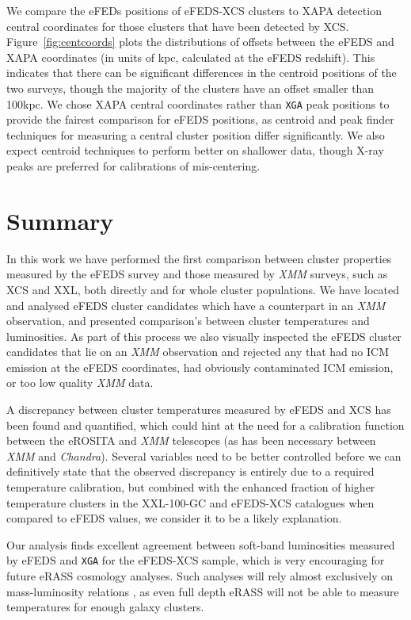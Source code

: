 \documentclass[fleqn,usenatbib]{mnras}
\begin{document}
We compare the eFEDs positions of eFEDS-XCS clusters to XAPA detection central coordinates for those clusters that have been detected by XCS.  Figure~\ref{fig:centcoords} plots the distributions of offsets between the eFEDS and XAPA coordinates (in units of kpc, calculated at the eFEDS redshift).  This indicates that there can be significant differences in the centroid positions of the two surveys, though the majority of the clusters have an offset smaller than 100kpc. We chose XAPA central coordinates rather than \texttt{XGA} peak positions to provide the fairest comparison for eFEDS positions, as centroid and peak finder techniques for measuring a central cluster position differ significantly.  We also expect centroid techniques to perform better on shallower data, though X-ray peaks are preferred for calibrations of mis-centering. 


\section{Summary}
\label{sec:summary}

In this work we have performed the first comparison between cluster properties measured by the eFEDS survey and those measured by {\em XMM} surveys, such as XCS and XXL, both directly and for whole cluster populations. We have located and analysed eFEDS cluster candidates which have a counterpart in an {\em XMM} observation, and presented comparison's between cluster temperatures and luminosities. As part of this process we also visually inspected the eFEDS cluster candidates that lie on an {\em XMM} observation and rejected any that had no ICM emission at the eFEDS coordinates, had obviously contaminated ICM emission, or too low quality {\em XMM} data.

A discrepancy between cluster temperatures measured by eFEDS and XCS has been found and quantified, which could hint at the need for a calibration function between the eROSITA and {\em XMM} telescopes (as has been necessary between {\em XMM} and {\em Chandra}). Several variables need to be better controlled before we can definitively state that the observed discrepancy is entirely due to a required temperature calibration, but combined with the enhanced fraction of higher temperature clusters in the XXL-100-GC and eFEDS-XCS catalogues when compared to eFEDS values, we consider it to be a likely explanation. 
 
Our analysis finds excellent agreement between soft-band luminosities measured by eFEDS and \texttt{XGA} for the eFEDS-XCS sample, which is very encouraging for future eRASS cosmology analyses. Such analyses will rely almost exclusively on mass-luminosity relations \citep[such as the eFEDS-HSC collaboration, ][]{efedsmor}, as even full depth eRASS will not be able to measure temperatures for enough galaxy clusters. 
\end{document}
